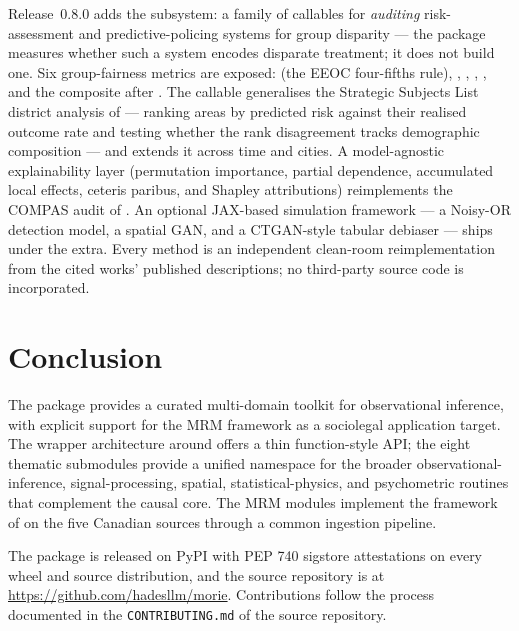 \documentclass[article,shortnames,nojss]{jss}
\begin{document}
Release~0.8.0 adds the  subsystem: a family of
callables for \emph{auditing} risk-assessment and predictive-policing
systems for group disparity --- the package measures whether such a
system encodes disparate treatment; it does not build one.  Six
group-fairness metrics are exposed: 
(the EEOC four-fifths rule), ,
, ,
, and the composite
 after
\citet{Barman2026PredictivePolicingBias}.  The
 callable generalises the Strategic
Subjects List district analysis of \citet{Lacherade2021PredPolChicago}
--- ranking areas by predicted risk against their realised outcome
rate and testing whether the rank disagreement tracks demographic
composition --- and  extends it across
time and cities.  A model-agnostic explainability layer (permutation
importance, partial dependence, accumulated local effects, ceteris
paribus, and Shapley attributions) reimplements the COMPAS audit of
\citet{Biecek2021XAIStories}.  An optional JAX-based simulation
framework --- a Noisy-OR detection model, a spatial GAN, and a
CTGAN-style tabular debiaser --- ships under the 
extra.  Every method is an independent clean-room reimplementation
from the cited works' published descriptions; no third-party source
code is incorporated.

\section{Conclusion}
\label{sec:conclusion}

The  package  provides a curated
multi-domain toolkit for observational inference, with explicit
support for the MRM framework as a sociolegal application target.
The wrapper architecture around  offers a thin
function-style API; the eight thematic submodules provide a
unified namespace for the broader observational-inference,
signal-processing, spatial, statistical-physics, and psychometric
routines that complement the causal core. The MRM modules
implement the framework of \citet{Ruhela2026MRM} on the five
Canadian sources through a common ingestion pipeline.

The package is released on PyPI with PEP 740 sigstore
attestations on every wheel and source distribution, and the
source repository is at \url{https://github.com/hadesllm/morie}.
Contributions follow the process documented in the
\texttt{CONTRIBUTING.md} of the source repository.
\end{document}
